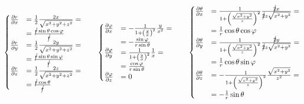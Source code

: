 \documentclass
[
a4paper,                      %
twoside,					  %
12pt,                         %
abstract,		      %
fleqn,                        %
]
{scrartcl} %
\begin{document}
\begin{description}
\begin{equation}
\begin{cases}
\frac{\partial r}{\partial x}&=\frac{1}{2}\frac{2x}{\sqrt{x^{2}+y^{2}+z^{2}}}=\\&=\frac{\cancel{r}\sin{\theta}\cos{\varphi}}{\cancel{r}}\\
\frac{\partial r}{\partial y}&=\frac{1}{2}\frac{2y}{\sqrt{x^{2}+y^{2}+z^{2}}}=\\&=\frac{\cancel{r}\sin{\theta}\sin{\varphi}}{\cancel{r}}\\
\frac{\partial r}{\partial z}&=\frac{1}{2}\frac{2z}{\sqrt{x^{2}+y^{2}+z^{2}}}=\\&=\frac{\cancel{r}\cos{\theta}}{\cancel{r}}\\
\end{cases}\qquad\begin{cases}
\frac{\partial \varphi}{\partial x}&=-\frac{1}{1+\left(\frac{y}{x}\right)^{2}}\frac{y}{x^{2}}=\\&=-\frac{\sin{\varphi}}{r\sin{\theta}}\\
\frac{\partial \varphi}{\partial y}&=\frac{1}{1+\left(\frac{y}{x}\right)^{2}}\frac{1}{x}=\\&=\frac{\cos{\varphi}}{r\sin{\theta}}\\
\frac{\partial \varphi}{\partial z}&=0\\
\end{cases}\qquad\begin{cases}
\frac{\partial \theta}{\partial x}&=\frac{1}{1+\left(\frac{\sqrt{x^{2}+y^{2}}}{z}\right)^{2}}\frac{\cancel{2}x}{\cancel{2}z\sqrt{x^{2}+y^{2}}}=\\&=\frac{1}{r}\cos{\theta}\cos{\varphi}\\
\frac{\partial \theta}{\partial y}&=\frac{1}{1+\left(\frac{\sqrt{x^{2}+y^{2}}}{z}\right)^{2}}\frac{\cancel{2}y}{\cancel{2}z\sqrt{x^{2}+y^{2}}}=\\&=\frac{1}{r}\cos{\theta}\sin{\varphi}\\
\frac{\partial \theta}{\partial z}&=-\frac{1}{1+\left(\frac{\sqrt{x^{2}+y^{2}}}{z}\right)^{2}}\frac{\sqrt{x^{2}+y^{2}}}{z^{2}}=\\&=-\frac{1}{r}\sin{\theta}\\
\end{cases}
\end{equation}


\end{description}
\end{document}
